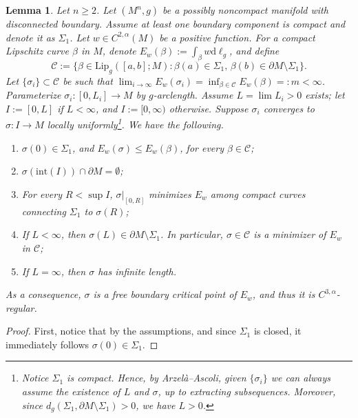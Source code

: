 \documentclass[12pt,a4paper,reqno]{amsart}
\newtheorem{lemma}{Lemma}
\theoremstyle{definition}
\renewcommand{\leq}{\leqslant}
\renewcommand{\geq}{\geqslant}
\begin{document}
{{
\begin{lemma}\label{lem:InteriorDoesNotTouchBoundaryAndOtherProperties}
Let $n\geq 2$. Let $(M^n,g)$ be a possibly noncompact manifold with disconnected boundary. Assume at least one boundary component is compact and denote it as $\Sigma_1$. Let $w\in C^{2,\alpha}(M)$ be a positive function. For a compact Lipschitz curve $\beta$ in $M$, denote  $E_w(\beta) := \int_\beta w \mathrm{d}\ell_g$, and define
\begin{equation}\label{eqn:MatchalCDefinition}
\mathcal{C}:=\Big\{\beta\in \mathrm{Lip}_g([a,b];M):\beta(a)\in \Sigma_1,\, \beta(b) \in \partial M \setminus \Sigma_1\Big\}.
\end{equation}
Let $\{\sigma_i\}\subset\mathcal{C}$ be such that $\lim_{i\to \infty} E_w(\sigma_i)=\inf_{\beta\in\mathcal{C}} E_w(\beta)=:m<\infty$. Parameterize $\sigma_i:[0,L_i]\to M$ by $g$-arclength. Assume $L=\lim L_i>0$ exists; let $I:=[0,L]$ if $L<\infty$, and $I:=[0,\infty)$ otherwise.
Suppose $\sigma_i$ converges to $\sigma:I\to M$ locally uniformly\footnote{Notice $\Sigma_1$ is compact. Hence, by Arzelà--Ascoli, given $\{\sigma_i\}$ we can always assume the existence of $L$ and $\sigma$, up to extracting subsequences. Moreover, since $d_g(\Sigma_1,\partial M\setminus \Sigma_1)>0$, we have $L>0$.}. We have the following.
\begin{enumerate}
    \item $\sigma(0)\in\Sigma_1$, and $E_w(\sigma)\leq E_w(\beta)$, for every $\beta\in\mathcal{C}$;
    \item $\sigma(\mathrm{int}(I))\cap \partial M=\emptyset$;
     \item For every $R<\sup I$, $\sigma|_{[0,R]}$ minimizes $E_w$ among compact curves connecting $\Sigma_1$ to $\sigma(R)$;
     \item If $L<\infty$, then $\sigma(L)\in \partial M\setminus\Sigma_1$. In particular, $\sigma\in\mathcal{C}$ is a minimizer of $E_w$ in $\mathcal{C}$;
     \item If $L=\infty$, then $\sigma$ has infinite length.
\end{enumerate}
As a consequence, $\sigma$ is a free boundary critical point of $E_w$, and thus it is $C^{3,\alpha}$-regular.
\end{lemma}
\begin{proof}
First, notice that by the assumptions, and since $\Sigma_1$ is closed, it immediately follows $\sigma(0)\in \Sigma_1$. 


\end{proof}}}
\end{document}
